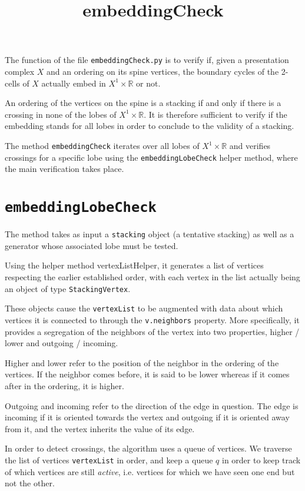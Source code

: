 \documentclass[12pt, letterpaper]{article}
\title{embeddingCheck}
\begin{document}
The function of the file \texttt{embeddingCheck.py} is to verify if, given a presentation complex $X$ and an ordering on its spine vertices, the boundary cycles of the 2-cells of $X$ actually embed in $X^1 \times \mathbb{R}$ or not.

An ordering of the vertices on the spine is a stacking if and only if there is a crossing in none of the lobes of $X^1 \times \mathbb{R}$. It is therefore sufficient to verify if the embedding stands for all lobes in order to conclude to the validity of a stacking.

The method \texttt{embeddingCheck} iterates over all lobes of $X^1 \times \mathbb{R}$ and verifies crossings for a specific lobe using the \texttt{embeddingLobeCheck} helper method, where the main verification takes place.

\section{\texttt{embeddingLobeCheck}}

    The method takes as input a \texttt{stacking} object (a tentative stacking) as well as a generator whose associated lobe must be tested.
    
    Using the helper method vertexListHelper, it generates a list of vertices respecting the earlier established order, with each vertex in the list actually being an object of type \texttt{StackingVertex}.
    
    These objects cause the \texttt{vertexList} to be augmented with data about which vertices it is connected to through the \texttt{v.neighbors} property. More specifically, it provides a segregation of the neighbors of the vertex into two properties, higher / lower and outgoing / incoming.
    
    Higher and lower refer to the position of the neighbor in the ordering of the vertices. If the neighbor comes before, it is said to be lower whereas if it comes after in the ordering, it is higher.
    
    Outgoing and incoming refer to the direction of the edge in question. The edge is incoming if it is oriented towards the vertex and outgoing if it is oriented away from it, and the vertex inherits the value of its edge.
    
    In order to detect crossings, the algorithm uses a queue of vertices. We traverse the list of vertices \texttt{vertexList} in order, and keep a queue $q$ in order to keep track of which vertices are still \emph{active}, i.e. vertices for which we have seen one end but not the other.
    
\end{document}
